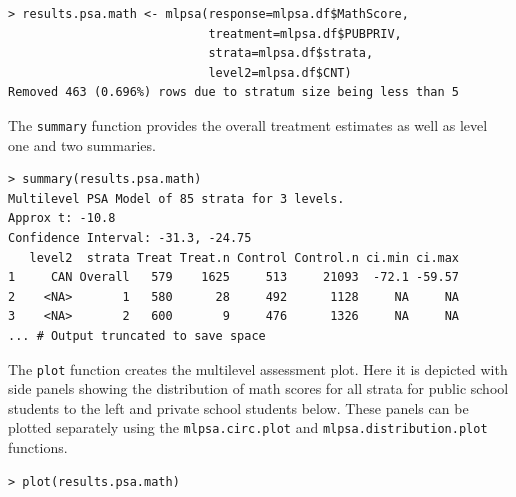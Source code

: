 \documentclass[letterpaper,12p,twoside]{article} %
\begin{document}
\begin{verbatim}
> results.psa.math <- mlpsa(response=mlpsa.df$MathScore, 
                            treatment=mlpsa.df$PUBPRIV, 
                            strata=mlpsa.df$strata, 
                            level2=mlpsa.df$CNT)
Removed 463 (0.696%) rows due to stratum size being less than 5
\end{verbatim}

\noindent The \texttt{summary} function provides the overall treatment estimates as well as level one and two summaries.

\begin{verbatim}
> summary(results.psa.math)
Multilevel PSA Model of 85 strata for 3 levels.
Approx t: -10.8
Confidence Interval: -31.3, -24.75
   level2  strata Treat Treat.n Control Control.n ci.min ci.max
1     CAN Overall   579    1625     513     21093  -72.1 -59.57
2    <NA>       1   580      28     492      1128     NA     NA
3    <NA>       2   600       9     476      1326     NA     NA
... # Output truncated to save space
\end{verbatim}

\noindent The \texttt{plot} function creates the multilevel assessment plot. Here it is depicted with side panels showing the distribution of math scores for all strata for public school students to the left and private school students below. These panels can be plotted separately using the \texttt{mlpsa.circ.plot} and \texttt{mlpsa.distribution.plot} functions.

\begin{verbatim}
> plot(results.psa.math)
\end{verbatim}
\end{document}

